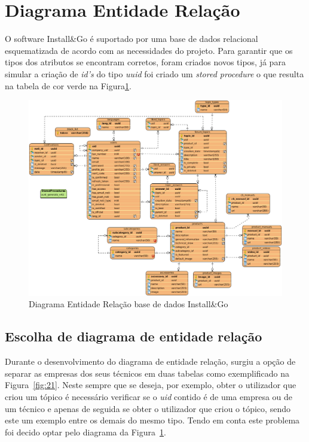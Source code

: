 \section{Diagrama Entidade Relação}

O software Install\&Go é suportado por uma base de dados relacional esquematizada de acordo com as necessidades do projeto. Para garantir que os tipos dos atributos se encontram corretos, foram criados novos tipos, já para simular a criação de \textit{id's} do tipo \textit{uuid} foi criado um \textit{stored procedure} o que resulta na tabela de cor verde na Figura\ref{fig:20}.

\begin{figure}[htb]
  \centering
  
  \includegraphics[width=\textwidth]{images/diagramas/diagrama_bd.png}
  \caption{Diagrama Entidade Relação base de dados Install\&Go}
  \label{fig:20}
\end{figure}

\newpage

\subsection{Escolha de diagrama de entidade relação}
Durante o desenvolvimento do diagrama de entidade relação, surgiu 
a opção de separar as empresas dos seus técnicos em duas tabelas como 
exemplificado na Figura~\ref{fig:21}. Neste sempre que se
deseja, por exemplo, obter o utilizador que criou um tópico é necessário
verificar se o \textit{uid} contido é de uma empresa ou de um técnico e apenas de seguida se obter o utilizador que criou o tópico, sendo este um exemplo entre os demais do mesmo tipo. Tendo em conta este problema foi decido optar pelo diagrama da Figura~\ref{fig:20}.

